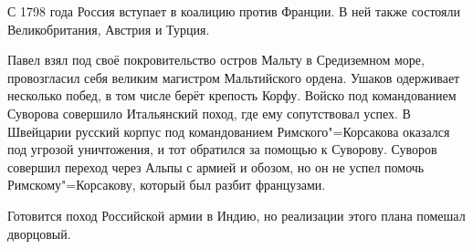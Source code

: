 С 1798 года Россия вступает в коалицию против Франции. В ней также состояли Великобритания, Австрия и Турция.

Павел взял под своё покровительство остров Мальту в Средиземном море, провозгласил себя великим магистром Мальтийского ордена. Ушаков одерживает несколько побед, в том числе берёт крепость Корфу. Войско под командованием Суворова совершило Итальянский поход, где ему сопутствовал успех. В Швейцарии русский корпус под командованием Римского"=Корсакова оказался под угрозой уничтожения, и тот обратился за помощью к Суворову.  Суворов совершил переход через Альпы с армией и обозом, но он не успел помочь Римскому"=Корсакову, который был разбит французами.

Готовится поход Российской армии в Индию, но реализации этого плана помешал дворцовый.





